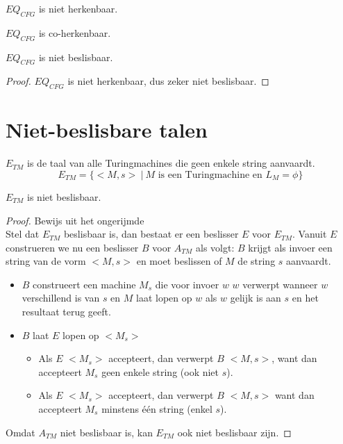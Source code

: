 \documentclass[main.tex]{subfiles}
\begin{document}
\begin{st}
  \label{st:eq-cfg-niet-herk}
  $EQ_{CFG}$ is niet herkenbaar.
\end{st}

\begin{st}
  \label{st:eq-cfg-coherk}
  $EQ_{CFG}$ is co-herkenbaar.
\end{st}

\begin{gev}
  \label{gev:eq-cfg-niet-besl}
  $EQ_{CFG}$ is niet beslisbaar.

  \begin{proof}
    $EQ_{CFG}$ is niet herkenbaar, dus zeker niet beslisbaar.
  \end{proof}
\end{gev}

\section{Niet-beslisbare talen}
\label{sec:niet-besl-talen}

\begin{de}
  \label{de:e-tm}
  $E_{TM}$ is de taal van alle Turingmachines die geen enkele string aanvaardt.
  \[ E_{TM} = \{ <M,s>\ |\ M \text{ is een Turingmachine en } L_{M} = \phi \} \]
\end{de}

\begin{st}
  \label{st:e-tm-niet-besl}
  $E_{TM}$ is niet beslisbaar.

  \begin{proof}
    Bewijs uit het ongerijmde\\
    Stel dat $E_{TM}$ beslisbaar is, dan bestaat er een beslisser $E$ voor $E_{TM}$.
    Vanuit $E$ construeren we nu een beslisser $B$ voor $A_{TM}$ als volgt:
    $B$ krijgt als invoer een string van de vorm $<M,s>$ en moet beslissen of $M$ de string $s$ aanvaardt.
    \begin{itemize}
    \item $B$ construeert een machine $M_{s}$ die voor invoer $w$ $w$ verwerpt wanneer $w$ verschillend is van $s$ en $M$ laat lopen op $w$ als $w$ gelijk is aan $s$ en het resultaat terug geeft.
    \item $B$ laat $E$ lopen op $<M_{s}>$
      \begin{itemize}
      \item Als $E$ $<M_{s}>$ accepteert, dan verwerpt $B$ $<M,s>$, want dan accepteert $M_{s}$ geen enkele string (ook niet $s$).
      \item Als $E$ $<M_{s}>$ accepteert, dan verwerpt $B$ $<M,s>$ want dan accepteert $M_{s}$ minstens \'e\'en string (enkel $s$).
      \end{itemize}
    \end{itemize}
    Omdat $A_{TM}$ niet beslisbaar is, kan $E_{TM}$ ook niet beslisbaar zijn.
  \end{proof}
\end{st}
\end{document}
